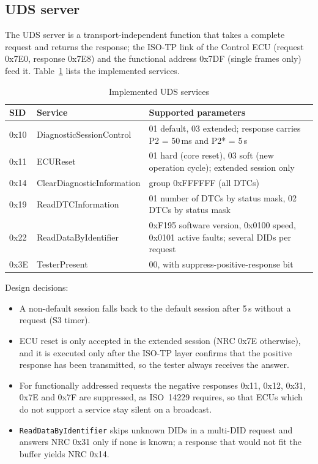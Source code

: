 \subsection{UDS server}

The UDS server is a transport-independent function that takes a complete request and returns the response; the ISO-TP link of the Control ECU (request 0x7E0, response 0x7E8) and the functional address 0x7DF (single frames only) feed it. Table~\ref{tab:uds} lists the implemented services.

\begin{table}[H]
\centering
\small
\caption{Implemented UDS services}
\label{tab:uds}
\begin{tabularx}{\textwidth}{@{}llX@{}}
\toprule
\textbf{SID} & \textbf{Service} & \textbf{Supported parameters} \\
\midrule
0x10 & DiagnosticSessionControl & 01 default, 03 extended; response carries P2 = 50\,ms and P2* = 5\,s \\
0x11 & ECUReset & 01 hard (core reset), 03 soft (new operation cycle); extended session only \\
0x14 & ClearDiagnosticInformation & group 0xFFFFFF (all DTCs) \\
0x19 & ReadDTCInformation & 01 number of DTCs by status mask, 02 DTCs by status mask \\
0x22 & ReadDataByIdentifier & 0xF195 software version, 0x0100 speed, 0x0101 active faults; several DIDs per request \\
0x3E & TesterPresent & 00, with suppress-positive-response bit \\
\bottomrule
\end{tabularx}
\end{table}

Design decisions:
\begin{itemize}[nosep]
  \item A non-default session falls back to the default session after 5\,s without a request (S3 timer).
  \item ECU reset is only accepted in the extended session (NRC 0x7E otherwise), and it is executed only after the ISO-TP layer confirms that the positive response has been transmitted, so the tester always receives the answer.
  \item For functionally addressed requests the negative responses 0x11, 0x12, 0x31, 0x7E and 0x7F are suppressed, as ISO~14229 requires, so that ECUs which do not support a service stay silent on a broadcast.
  \item \texttt{ReadDataByIdentifier} skips unknown DIDs in a multi-DID request and answers NRC 0x31 only if none is known; a response that would not fit the buffer yields NRC 0x14.
\end{itemize}

